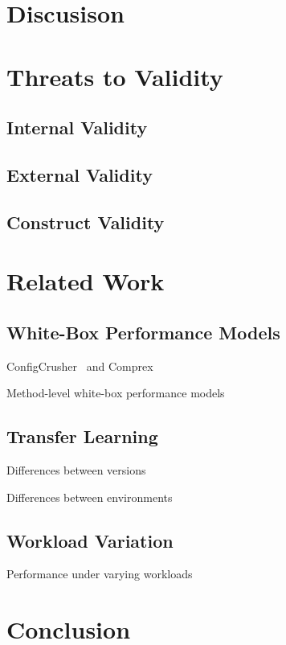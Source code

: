 \documentclass[conference]{IEEEtran}
\begin{document}
\section{Discusison}
\section{Threats to Validity}
\subsection{Internal Validity}
\subsection{External Validity}
\subsection{Construct Validity}
\section{Related Work}
\subsection{White-Box Performance Models}
ConfigCrusher~\cite{velez_2020_configcrusher_jase} and Comprex~\cite{velez_comprex_2021}

Method-level white-box performance models~\cite{weber_white_2021}
\subsection{Transfer Learning}
Differences between versions\cite{muehlbauer_identifying_2020}

Differences between environments~\cite{jamishidi_transfer_2017,jamshidi_learning_2018,jamshidi_transfer_gp_2017,muehlbauer_identifying_2020}
\subsection{Workload Variation}
Performance under varying workloads~\cite{liao_2020_using_emse}
\section{Conclusion}

\clearpage


\end{document}
